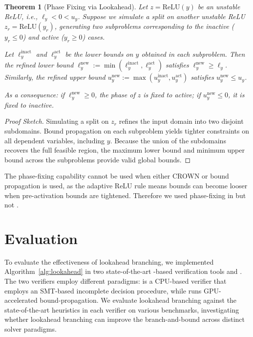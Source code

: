 \documentclass{article}
\newtheorem{theorem}{Theorem}
\begin{document}
\begin{theorem}[Phase Fixing via Lookahead]
Let $z = \mathrm{ReLU}(y)$ be an unstable ReLU, i.e., $\ell_y < 0 < u_y$. Suppose we simulate a split on another unstable ReLU $z_r = \mathrm{ReLU}(y_r)$, generating two subproblems corresponding to the inactive ($y_r \leq 0$) and active ($y_r \geq 0$) cases.

Let $\ell_y^{\mathrm{inact}}$ and $\ell_y^{\mathrm{act}}$ be the lower bounds on $y$ obtained in each subproblem. Then the refined lower bound $\ell_y^{\mathrm{new}} := \min(\ell_y^{\mathrm{inact}}, \ell_y^{\mathrm{act}})$ satisfies $\ell_y^{\mathrm{new}} \geq \ell_y$. Similarly, the refined upper bound $u_y^{\mathrm{new}} := \max(u_y^{\mathrm{inact}}, u_y^{\mathrm{act}})$ satisfies $u_y^{\mathrm{new}} \leq u_y$.

As a consequence: if $\ell_y^{\mathrm{new}} \geq 0$, the phase of $z$ is fixed to \emph{active}; if $u_y^{\mathrm{new}} \leq 0$, it is fixed to \emph{inactive}.
\end{theorem}

\begin{proof}[Proof Sketch]
Simulating a split on $z_r$ refines the input domain into two disjoint subdomains. Bound propagation on each subproblem yields tighter constraints on all dependent variables, including $y$. Because the union of the subdomains recovers the full feasible region, the maximum lower bound and minimum upper bound across the subproblems provide valid global bounds.
\end{proof}

The phase-fixing capability cannot be used when either CROWN or \acrown bound propagation is used, as the adaptive ReLU rule means bounds can become looser when pre-activation bounds are tightened. Therefore we used phase-fixing in \marabou but not \abcrown.

\section{Evaluation}\label{sec:eval}
To evaluate the effectiveness of lookahead branching, we implemented Algorithm~\ref{alg:lookahead} in two state-of-the-art \bab-based verification tools \marabou and \abcrown. The two verifiers employ different paradigms: \marabou is a CPU-based verifier that employs an SMT-based incomplete decision procedure, while \abcrown runs GPU-accelerated bound-propagation. We evaluate lookahead branching against the state-of-the-art heuristics in each verifier on various benchmarks, investigating whether lookahead branching can improve the branch-and-bound across distinct solver paradigms.
\end{document}
